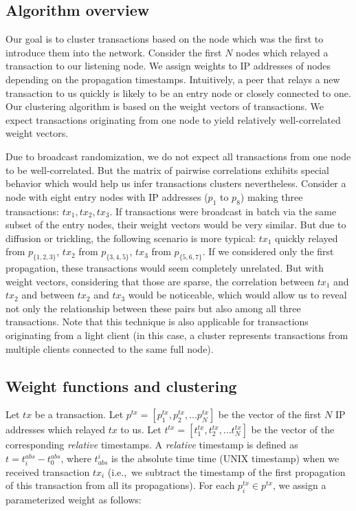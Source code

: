 \subsection{Algorithm overview}

Our goal is to cluster transactions based on the node which was the first to introduce them into the network.
Consider the first $N$ nodes which relayed a transaction to our listening node.
We assign weights to IP addresses of nodes depending on the propagation timestamps.
Intuitively, a peer that relays a new transaction to us quickly is likely to be an entry node or closely connected to one.
Our clustering algorithm is based on the weight vectors of transactions.
We expect transactions originating from one node to yield relatively well-correlated weight vectors.

Due to broadcast randomization, we do not expect all transactions from one node to be well-correlated.
But the matrix of pairwise correlations exhibits special behavior which would help us infer transactions clusters nevertheless.
Consider a node with eight entry nodes with IP addresses ($p_1$ to $p_8$) making three transactions: $tx_1, tx_2, tx_3$.
If transactions were broadcast in batch via the same subset of the entry nodes, their weight vectors would be very similar.
But due to diffusion or trickling, the following scenario is more typical: $tx_1$ quickly relayed from $p_{\{1,2,3\}}$, $tx_2$ from $p_{\{3,4,5\}}$, $tx_3$ from $p_{\{5,6,7\}}$.
If we considered only the first propagation, these transactions would seem completely unrelated.
But with weight vectors, considering that those are sparse, the correlation between $tx_1$ and $tx_2$ and between $tx_2$ and $tx_3$ would be noticeable, which would allow us to reveal not only the relationship between these pairs but also among all three transactions.
Note that this technique is also applicable for transactions originating from a light client (in this case, a cluster represents transactions from multiple clients connected to the same full node).

\subsection{Weight functions and clustering}

Let $tx$ be a transaction.
Let $p^{tx} = [p^{tx}_1, p^{tx}_2, ... p^{tx}_N]$ be the vector of the first $N$ IP addresses which relayed $tx$ to us.
Let $t^{tx} = [t^{tx}_1, t^{tx}_2, ... t^{tx}_N]$ be the vector of the corresponding \textit{relative} timestamps.
A \textit{relative} timestamp is defined as $t = t^{abs}_i - t^{abs}_0$, where $t_{abs}^i$ is the absolute time time (UNIX timestamp) when we received transaction $tx_i$ (i.e.,~we subtract the timestamp of the first propagation of this transaction from all its propagations).
For each $p^{tx}_i \in p^{tx}$, we assign a parameterized weight as follows:

